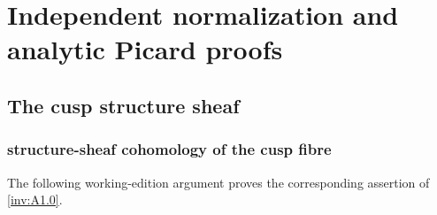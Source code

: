 \section{Independent normalization and analytic Picard proofs}\label{inv:wb:analytic-picard-proofs}
\subsection{The cusp structure sheaf}

\subsubsection{structure-sheaf cohomology of the cusp fibre}\label{inv:wbproof:lem:cusp-structure-sheaf-audit}
The following working-edition argument proves the corresponding assertion of \cref{inv:A1.0}.


